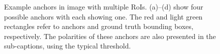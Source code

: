 \begin{figure}[!h]
    \caption[Example anchors in image with multiple RoIs]{Example anchors in image  with multiple RoIs. (a)--(d) show four possible anchors with each showing one. The red and light green rectangles refer to anchors and ground truth bounding boxes, respectively. The polarities of these anchors are also presented in the sub-captions, using the typical threshold.}
	\label{fig:eganchor}
\end{figure}